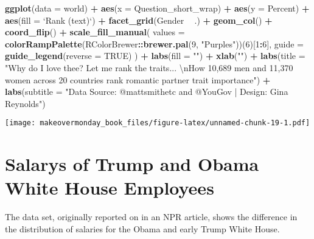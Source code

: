 \documentclass[]{book}
\newenvironment{Shaded}{\begin{snugshade}}{\end{snugshade}}
\newcommand{\KeywordTok}[1]{\textcolor[rgb]{0.13,0.29,0.53}{\textbf{#1}}}
\newcommand{\DataTypeTok}[1]{\textcolor[rgb]{0.13,0.29,0.53}{#1}}
\newcommand{\DecValTok}[1]{\textcolor[rgb]{0.00,0.00,0.81}{#1}}
\newcommand{\CharTok}[1]{\textcolor[rgb]{0.31,0.60,0.02}{#1}}
\newcommand{\StringTok}[1]{\textcolor[rgb]{0.31,0.60,0.02}{#1}}
\newcommand{\OtherTok}[1]{\textcolor[rgb]{0.56,0.35,0.01}{#1}}
\newcommand{\OperatorTok}[1]{\textcolor[rgb]{0.81,0.36,0.00}{\textbf{#1}}}
\newcommand{\NormalTok}[1]{#1}
\theoremstyle{definition}
\theoremstyle{definition}
\theoremstyle{definition}
\theoremstyle{remark}
\begin{document}
\begin{Shaded}
\begin{Highlighting}[]
\KeywordTok{ggplot}\NormalTok{(}\DataTypeTok{data =}\NormalTok{ world) }\OperatorTok{+}\StringTok{ }
\StringTok{  }\KeywordTok{aes}\NormalTok{(}\DataTypeTok{x =}\NormalTok{ Question_short_wrap) }\OperatorTok{+}
\StringTok{  }\KeywordTok{aes}\NormalTok{(}\DataTypeTok{y =}\NormalTok{ Percent) }\OperatorTok{+}
\StringTok{  }\KeywordTok{aes}\NormalTok{(}\DataTypeTok{fill =} \StringTok{`}\DataTypeTok{Rank (text)}\StringTok{`}\NormalTok{) }\OperatorTok{+}
\StringTok{  }\KeywordTok{facet_grid}\NormalTok{(Gender }\OperatorTok{~}\StringTok{ }\NormalTok{.) }\OperatorTok{+}
\StringTok{  }\KeywordTok{geom_col}\NormalTok{() }\OperatorTok{+}
\StringTok{  }\KeywordTok{coord_flip}\NormalTok{() }\OperatorTok{+}
\StringTok{  }\KeywordTok{scale_fill_manual}\NormalTok{(}
    \DataTypeTok{values =} \KeywordTok{colorRampPalette}\NormalTok{(RColorBrewer}\OperatorTok{::}\KeywordTok{brewer.pal}\NormalTok{(}\DecValTok{9}\NormalTok{, }\StringTok{"Purples"}\NormalTok{))(}\DecValTok{6}\NormalTok{)[}\DecValTok{1}\OperatorTok{:}\DecValTok{6}\NormalTok{],}
    \DataTypeTok{guide =} \KeywordTok{guide_legend}\NormalTok{(}\DataTypeTok{reverse =} \OtherTok{TRUE}\NormalTok{)}
\NormalTok{  ) }\OperatorTok{+}
\StringTok{  }\KeywordTok{labs}\NormalTok{(}\DataTypeTok{fill =} \StringTok{""}\NormalTok{) }\OperatorTok{+}
\StringTok{  }\KeywordTok{xlab}\NormalTok{(}\StringTok{""}\NormalTok{) }\OperatorTok{+}
\StringTok{  }\KeywordTok{labs}\NormalTok{(}\DataTypeTok{title =} \StringTok{"Why do I love thee?  Let me rank the traits... }\CharTok{\textbackslash{}n}\StringTok{How 10,689 men and 11,370 women across 20 countries rank romantic partner trait importance"}\NormalTok{) }\OperatorTok{+}
\StringTok{  }\KeywordTok{labs}\NormalTok{(}\DataTypeTok{subtitle =} \StringTok{"Data Source: @mattsmithetc and @YouGov | Design: Gina Reynolds"}\NormalTok{) }
\end{Highlighting}
\end{Shaded}

\texttt{[image: makeovermonday\_book\_files/figure-latex/unnamed-chunk-19-1.pdf]}

\chapter{Salarys of Trump and Obama White House
Employees}\label{salarys-of-trump-and-obama-white-house-employees}

The data set, originally reported on in an NPR article, shows the
difference in the distribution of salaries for the Obama and early Trump
White House.
\end{document}
